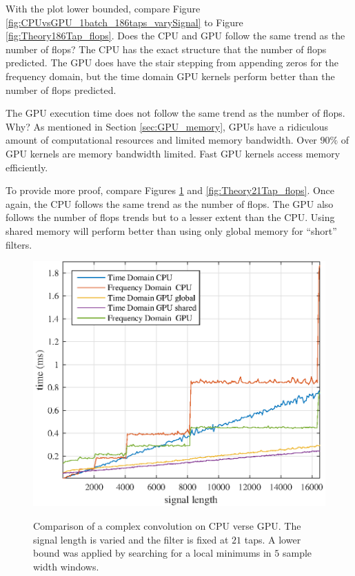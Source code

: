 With the plot lower bounded, compare Figure \ref{fig:CPUvsGPU_1batch_186taps_varySignal} to Figure \ref{fig:Theory186Tap_flops}.
Does the CPU and GPU follow the same trend as the number of flops?
The CPU has the exact structure that the number of flops predicted.
The GPU does have the stair stepping from appending zeros for the frequency domain, but the time domain GPU kernels perform better than the number of flops predicted.

The GPU execution time does not follow the same trend as the number of flops.
Why? As mentioned in Section \ref{sec:GPU_memory}, GPUs have a ridiculous amount of computational resources and limited memory bandwidth.
Over $90\%$ of GPU kernels are memory bandwidth limited.
Fast GPU kernels access memory efficiently.

To provide more proof, compare Figures \ref{fig:CPUvsGPU_1batch_21taps_varySignal} and \ref{fig:Theory21Tap_flops}.
Once again, the CPU follows the same trend as the number of flops.
The GPU also follows the number of flops trends but to a lesser extent than the CPU.
Using shared memory will perform better than using only global memory for ``short'' filters.
\begin{figure}
	\caption{Comparison of a complex convolution on CPU verse GPU. The signal length is varied and the filter is fixed at $21$ taps. A lower bound was applied by searching for a local minimums in $5$ sample width windows.}
	\centering\includegraphics[width=5in]{figures/gpu_intro/CPUvsGPU_1batch_21taps_varySignal.eps}
	\label{fig:CPUvsGPU_1batch_21taps_varySignal}
\end{figure}

